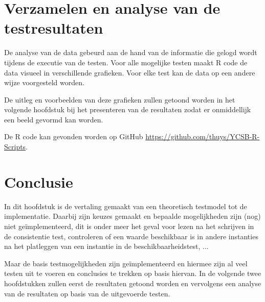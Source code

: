 \section{Verzamelen en analyse van de testresultaten}
De analyse van de data gebeurd aan de hand van de informatie die gelogd wordt tijdens de executie van de testen. Voor alle mogelijke testen maakt R code de data visueel in verschillende grafieken. Voor elke test kan de data op een andere wijze voorgesteld worden. 

De uitleg en voorbeelden van deze grafieken zullen getoond worden in het volgende hoofdstuk bij het presenteren van de resultaten zodat er onmiddellijk een beeld gevormd kan worden.

De R code kan gevonden worden op GitHub \url{https://github.com/thuys/YCSB-R-Scripts}.  

\section{Conclusie}
In dit hoofdstuk is de vertaling gemaakt van een theoretisch testmodel tot de implementatie. Daarbij zijn keuzes gemaakt en bepaalde mogelijkheden zijn (nog) niet geïmplementeerd, dit is onder meer het geval voor lezen na het schrijven in de consistentie test, controleren of een waarde beschikbaar is in andere instanties na het platleggen van een instantie in de beschikbaarheidstest, ...

Maar de basis testmogelijkheden zijn geïmplementeerd en hiermee zijn al veel testen uit te voeren en conclusies te trekken op basis hiervan. In de volgende twee hoofdstukken zullen eerst de resultaten getoond worden en vervolgens een analyse van de resultaten op basis van de uitgevoerde testen.

